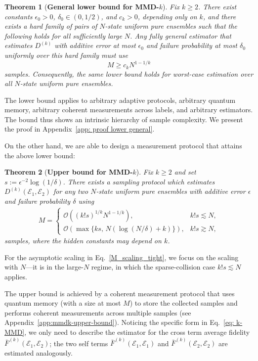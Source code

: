 \documentclass[aps,prx,reprint,superscriptaddress,amsmath,amssymb,longbibliography,floatfix]{revtex4-2}
\newcommand{\scE}{\mathcal{E}}
\newcommand{\scO}{\mathcal{O}}
\theoremstyle{plain}
\newtheorem{theorem}{Theorem}[section]
\theoremstyle{definition}
\theoremstyle{remark}
\begin{document}
\begin{theorem}[\textbf{General lower bound for MMD-$k$}]\label{thm:mmdk-lower-fullygeneral}
Fix $k\ge 2$. There exist constants $\epsilon_0>0$, $\delta_0\in(0,1/2)$, and $c_k>0$, depending only on $k$, and there exists a hard family of pairs of $N$-state uniform pure ensembles such that the following holds for all sufficiently large $N$. Any fully general estimator that estimates $D^{(k)}$ with additive error at most $\epsilon_0$ and failure probability at most $\delta_0$ uniformly over this hard family must use
$$
M\ge c_k N^{1-1/k}
$$
samples. Consequently, the same lower bound holds for worst-case estimation over all $N$-state uniform pure ensembles.
\end{theorem}

The lower bound applies to arbitrary adaptive protocols, arbitrary quantum memory, arbitrary coherent measurements across labels, and arbitrary estimators. The bound thus shows an intrinsic hierarchy of sample complexity. We present the proof in Appendix~\ref{app: proof lower general}.


On the other hand, we are able to design a measurement protocol that attains the above lower bound:
\begin{theorem}[\textbf{Upper bound for MMD-$k$}]\label{thm:mmdk-upper}
Fix $k\ge 2$ and set $s:=\epsilon^{-2}\log(1/\delta)$. There exists a sampling protocol which estimates $D^{(k)}(\scE_1,\scE_2)$ for any two $N$-state uniform pure ensembles with additive error $\epsilon$ and failure probability $\delta$ using
\begin{align}
M=
\begin{cases}
\scO\!\left((k!s)^{1/k}N^{1-1/k}\right),
& k!s\lesssim N,\\[1mm]
\scO\!\left(\max\{ks,\,N(\log(N/\delta)+k)\}\right),
& k!s\gtrsim N,
\end{cases}
\end{align}
samples, where the hidden constants may depend on $k$.
\end{theorem}
For the asymptotic scaling in Eq.~\eqref{M_scaling_tight}, we focus on the scaling with $N$---it is in the large-$N$ regime, in which the sparse-collision case $k!s\lesssim N$ applies.


The upper bound is achieved by a coherent measurement protocol that uses quantum memory (with a size at most $M$) to store the collected samples and performs coherent measurements across multiple samples (see Appendix~\ref{app:mmdk-upper-bound}). Noticing the specific form in Eq.~\eqref{eq: k-MMD}, we only need to describe the estimator for the cross term average fidelity $\bar F^{(k)}(\scE_1,\scE_2)$; the two self terms $\bar{F}^{(k)}(\scE_1, \scE_1)$ and $\bar{F}^{(k)}(\scE_2, \scE_2)$ are estimated analogously. 
\end{document}
